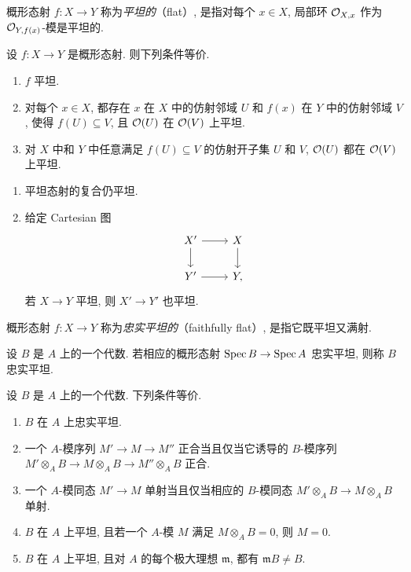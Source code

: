 \begin{definition}\label{ch01:def1.7}
概形态射 $f\colon X\to Y$ 称为\emph{平坦的}（flat）, 是指对每个 $x\in X$, 局部环 $\mathcal O_{X,x}$ 作为 $\mathcal O_{Y,f(x)}$-模是平坦的.
\end{definition}

\begin{proposition}\label{ch01:prop1.8}
设 $f\colon X\to Y$ 是概形态射. 则下列条件等价.
\begin{enumerate}
\item $f$ 平坦.
\item 对每个 $x\in X$, 都存在 $x$ 在 $X$ 中的仿射邻域 $U$ 和 $f(x)$ 在 $Y$ 中的仿射邻域 $V$, 使得 $f(U)\subseteq V$, 且 $\mathcal O(U)$ 在 $\mathcal O(V)$ 上平坦.
\item 对 $X$ 中和 $Y$ 中任意满足 $f(U)\subseteq V$ 的仿射开子集 $U$ 和 $V$, $\mathcal O(U)$ 都在 $\mathcal O(V)$ 上平坦.
\end{enumerate}
\end{proposition}

\begin{proposition}\label{ch01:prop1.9}
\begin{enumerate}
\item 平坦态射的复合仍平坦.
\item 给定 Cartesian 图
\[\begin{tikzcd}X'\ar[r]\ar[d]&X\ar[d]\\Y'\ar[r]&Y,\end{tikzcd}\]
若 $X\to Y$ 平坦, 则 $X'\to Y'$ 也平坦.
\end{enumerate}
\end{proposition}

\begin{definition}\label{ch01:def1.10}
概形态射 $f\colon X\to Y$ 称为\emph{忠实平坦的}（faithfully flat）, 是指它既平坦又满射.
\end{definition}

设 $B$ 是 $A$ 上的一个代数. 若相应的概形态射 $\operatorname{Spec} B\to\operatorname{Spec} A$ 忠实平坦, 则称 $B$ 忠实平坦.

\begin{proposition}\label{ch01:prop1.11}
设 $B$ 是 $A$ 上的一个代数. 下列条件等价.
\begin{enumerate}
\item $B$ 在 $A$ 上忠实平坦.
\item 一个 $A$-模序列 $M'\to M\to M''$ 正合当且仅当它诱导的 $B$-模序列 $M'\otimes_A B\to M\otimes_A B\to M''\otimes_A B$ 正合.
\item 一个 $A$-模同态 $M'\to M$ 单射当且仅当相应的 $B$-模同态 $M'\otimes_A B\to M\otimes_A B$ 单射.
\item $B$ 在 $A$ 上平坦, 且若一个 $A$-模 $M$ 满足 $M\otimes_A B=0$, 则 $M=0$.
\item $B$ 在 $A$ 上平坦, 且对 $A$ 的每个极大理想 $\mathfrak m$, 都有 $\mathfrak mB\ne B$.
\end{enumerate}
\end{proposition}

